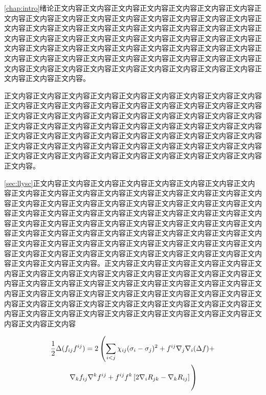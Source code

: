 \label{chap:intro}

\cref{chap:intro}绪论正文内容\cite{同鸣2012}正文内容正文内容正文内容正文内容正文内容正文内容正文内容正文内容正文内容正文内容正文内容正文内容正文内容正文内容正文内容正文内容正文内容正文内容正文内容正文内容正文内容正文内容正文内容正文内容正文内容正文内容正文内容正文内容正文内容正文内容正文内容正文内容正文内容正文内容正文内容正文内容正文内容正文内容正文内容正文内容正文内容正文内容正文内容正文内容正文内容正文内容正文内容正文内容正文内容正文内容正文内容正文内容正文内容正文内容正文内容正文内容正文内容正文内容正文内容正文内容正文内容正文内容正文内容。

正文内容正文内容正文内容正文内容正文内容正文内容\cite{Boutsidis2011}正文内容正文内容正文内容正文内容正文内容正文内容正文内容正文内容正文内容正文内容正文内容正文内容正文内容正文内容正文内容正文内容正文内容正文内容正文内容正文内容正文内容正文内容正文内容正文内容正文内容正文内容正文内容正文内容正文内容正文内容正文内容正文内容正文内容正文内容正文内容正文内容正文内容正文内容正文内容正文内容正文内容正文内容正文内容正文内容正文内容正文内容正文内容正文内容正文内容正文内容正文内容正文内容正文内容正文内容正文内容正文内容正文内容正文内容。


\label{sec:llysc}

\cref{sec:llysc}\citep{同鸣2012}正文内容正文内容\citet{同鸣2012}正文内容正文内容正文内容正文内容\cite{同鸣2012, Lee1999, Tang2013, Ding2006Orthogonal}正文内容正文内容正文内容正文内容正文内容正文内容正文内容正文内容正文内容正文内容正文内容正文内容正文内容正文内容正文内容正文内容正文内容正文内容正文内容正文内容正文内容正文内容正文内容正文内容正文内容正文内容正文内容正文内容正文内容正文内容正文内容正文内容正文内容正文内容正文内容正文内容正文内容正文内容正文内容正文内容正文内容正文内容正文内容正文内容正文内容正文内容正文内容正文内容正文内容正文内容正文内容正文内容正文内容正文内容正文内容正文内容正文内容正文内容正文内容正文内容正文内容正文内容正文内容正文内容正文内容正文内容正文内容正文内容。正文内容正文内容正文内容正文内容正文内容正文内容正文内容正文内容正文内容正文内容正文内容正文内容正文内容正文内容正文内容正文内容正文内容正文内容正文内容正文内容正文内容正文内容正文内容正文内容正文内容正文内容正文内容正文内容正文内容正文内容正文内容正文内容正文内容正文内容正文内容正文内容正文内容正文内容正文内容正文内容正文内容正文内容正文内容正文内容正文内容正文内容正文内容正文内容正文内容正文内容正文内容正文内容正文内容

\begin{multline}
\frac{1}{2}\Delta(f_{ij}f^{ij})=
2\left(\sum_{i<j}\chi_{ij}(\sigma_i-\sigma_j)^2+f^{ij}\nabla_j\nabla_i(\Delta f)+\right .\\
\left .\nabla_kf_{ij}\nabla^kf^{ij}+f^{ij}f^k\left[2\nabla_iR_{jk}-\nabla_kR_{ij}\right]\vphantom{\sum_{i<j}}\right)
\end{multline}


